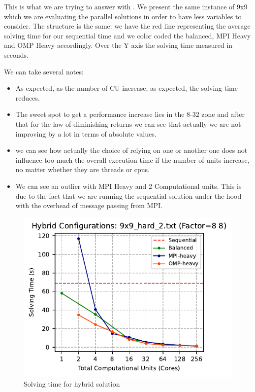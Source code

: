 This is what we are trying to answer with . We present the same instance of 9x9 which we are evaluating the parallel solutions in order to have less variables to consider. The structure is the same: we have the red line representing the average solving time for our sequential time and we color coded the balanced, MPI Heavy and OMP Heavy accordingly. Over the Y axis the solving time measured in seconds.

We can take several notes:
\begin{itemize}
    \item As expected, as the number of CU increase, as expected, the solving time reduces.
    \item The sweet spot to get a performance increase lies in the 8-32 zone and after that for the law of diminishing returns we can see that actually we are not improving by a lot in terms of absolute values.
    \item we can see how actually the choice of relying on one or another one does not influence too much the overall execution time if the number of units increase, no matter whether they are threads or cpus.
    \item We can see an outlier with MPI Heavy and 2 Computational units. This is due to the fact that we are running the sequential solution under the hood with the overhead of message passing from MPI.
\end{itemize}

\begin{figure}[htbp]
\centering
\includegraphics[width=0.9\linewidth]{imgs/solving_time_hybrid_9x9_hard_2.pdf}
\caption{Solving time for hybrid solution}
\label{fig:solving_time_hybrid_9x9}
\end{figure}

